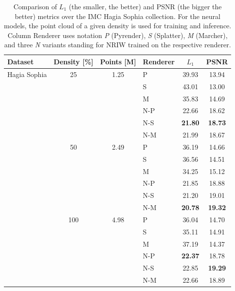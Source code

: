 \def\m{~\mathrm{m}}
\def\M{\mathrm{m}}
\def\dg{^{\circ}}
\def\D{\phantom{0}}
\def\B{\textbf}
\begin{table}[hb]
\caption[Comparison of $L_1$ and PSNR metrics over Hagia Sophia collection]{
Comparison of $L_1$ (the smaller, the better) and PSNR (the bigger the
better) metrics over the IMC Hagia Sophia collection. For the neural models,
the point cloud of a given density is used for training and inference. Column
Renderer uses notation \emph{P} (Pyrender), \emph{S} (Splatter),
\emph{M} (Marcher), and three \emph{N} variants standing for NRIW trained
on the respective renderer.}
\centering
    \begin{tabular}{l c c l S[table-format=3.2] S[table-format=3.2]}
    \toprule
    Dataset & Density [\%] & Points [M] & Renderer & {$L_1$} & {PSNR}\\
    \midrule
    Hagia Sophia & 25  & 1.25 & P   &    39.93  &    13.94  \\
                 &     &      & S   &    43.01  &    13.00  \\
                 &     &      & M   &    35.83  &    14.69  \\
                 &     &      & N-P &    22.66  &    18.62  \\
                 &     &      & N-S & \B{21.80} & \B{18.73} \\
                 &     &      & N-M &    21.99  &    18.67  \\[0.3cm]

                 & 50  & 2.49 & P   &    36.19  &    14.66  \\
                 &     &      & S   &    36.56  &    14.51  \\
                 &     &      & M   &    34.25  &    15.12  \\
                 &     &      & N-P &    21.85  &    18.88  \\
                 &     &      & N-S &    21.20  &    19.01  \\
                 &     &      & N-M & \B{20.78} & \B{19.32} \\[0.3cm]

                 & 100 & 4.98 & P   &    36.04  &    14.70  \\
                 &     &      & S   &    35.11  &    14.91  \\
                 &     &      & M   &    37.19  &    14.37  \\
                 &     &      & N-P & \B{22.37} &    18.78  \\
                 &     &      & N-S &    22.85  & \B{19.29} \\
                 &     &      & N-M &    22.66  &    18.89  \\
    \bottomrule
    \end{tabular}
\label{tab:hagia_rendering_metrics}
\end{table}

